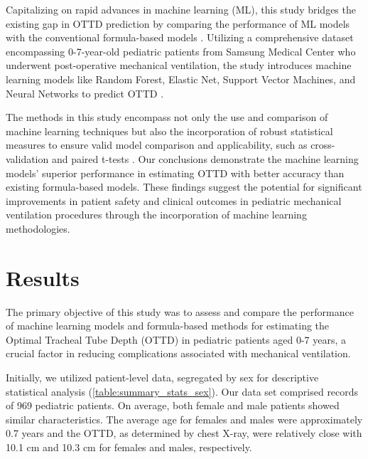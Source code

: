 \documentclass[11pt]{article}
\begin{document}
Capitalizing on rapid advances in machine learning (ML), this study bridges the existing gap in OTTD prediction by comparing the performance of ML models with the conventional formula-based models \cite{Dunn2020BenchmarkingMP}. Utilizing a comprehensive dataset encompassing 0-7-year-old pediatric patients from Samsung Medical Center who underwent post-operative mechanical ventilation, the study introduces machine learning models like Random Forest, Elastic Net, Support Vector Machines, and Neural Networks to predict OTTD \cite{Johnson2023MIMICIVAF}.

The methods in this study encompass not only the use and comparison of machine learning techniques but also the incorporation of robust statistical measures to ensure valid model comparison and applicability, such as cross-validation and paired t-tests \cite{Shang2019DemocratizingDS}. Our conclusions demonstrate the machine learning models' superior performance in estimating OTTD with better accuracy than existing formula-based models. These findings suggest the potential for significant improvements in patient safety and clinical outcomes in pediatric mechanical ventilation procedures through the incorporation of machine learning methodologies.

\section*{Results}

The primary objective of this study was to assess and compare the performance of machine learning models and formula-based methods for estimating the Optimal Tracheal Tube Depth (OTTD) in pediatric patients aged 0-7 years, a crucial factor in reducing complications associated with mechanical ventilation.

Initially, we utilized patient-level data, segregated by sex for descriptive statistical analysis (\ref{table:summary_stats_sex}). Our data set comprised records of 969 pediatric patients. On average, both female and male patients showed similar characteristics. The average age for females and males were approximately 0.7 years and the OTTD, as determined by chest X-ray, were relatively close with 10.1 cm and 10.3 cm for females and males, respectively.
\end{document}
